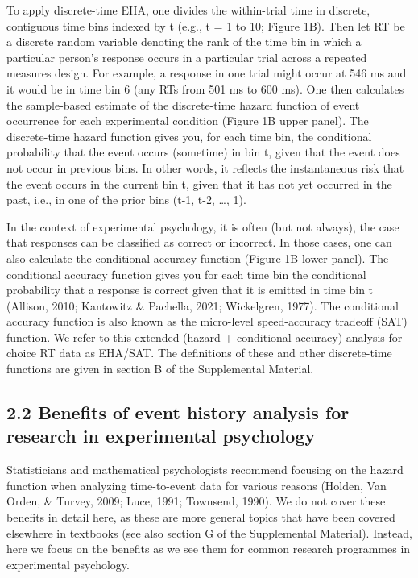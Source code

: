 \documentclass[
  man, donotrepeattitle,floatsintext]{apa6}
\begin{document}
To apply discrete-time EHA, one divides the within-trial time in discrete, contiguous time bins indexed by t (e.g., t = 1 to 10; Figure 1B).
Then let RT be a discrete random variable denoting the rank of the time bin in which a particular person's response occurs in a particular trial across a repeated measures design.
For example, a response in one trial might occur at 546 ms and it would be in time bin 6 (any RTs from 501 ms to 600 ms).
One then calculates the sample-based estimate of the discrete-time hazard function of event occurrence for each experimental condition (Figure 1B upper panel).
The discrete-time hazard function gives you, for each time bin, the conditional probability that the event occurs (sometime) in
bin t, given that the event does not occur in previous bins.
In other words, it reflects the instantaneous risk that the event occurs in the current bin t, given that it has not yet
occurred in the past, i.e., in one of the prior bins (t-1, t-2, \ldots, 1).

In the context of experimental psychology, it is often (but not always), the case that responses can be classified as correct or incorrect.
In those cases, one can also calculate the conditional accuracy function (Figure 1B lower panel).
The conditional accuracy function gives you for each time bin the conditional probability that a response is correct given that it is emitted in time bin t (Allison, 2010; Kantowitz \& Pachella, 2021; Wickelgren, 1977).
The conditional accuracy function is also known as the micro-level speed-accuracy tradeoff (SAT) function.
We refer to this extended (hazard + conditional accuracy) analysis for choice RT data as EHA/SAT. The definitions of these and other discrete-time functions are given in section B of the Supplemental Material.

\subsection{2.2 Benefits of event history analysis for research in experimental psychology}\label{benefits-of-event-history-analysis-for-research-in-experimental-psychology}

Statisticians and mathematical psychologists recommend focusing on the hazard function when analyzing time-to-event data for various reasons (Holden, Van Orden, \& Turvey, 2009; Luce, 1991; Townsend, 1990).
We do not cover these benefits in detail here, as these are more general topics that have been covered elsewhere in textbooks (see also section G of the Supplemental Material).
Instead, here we focus on the benefits as we see them for common research programmes in experimental psychology.
\end{document}
